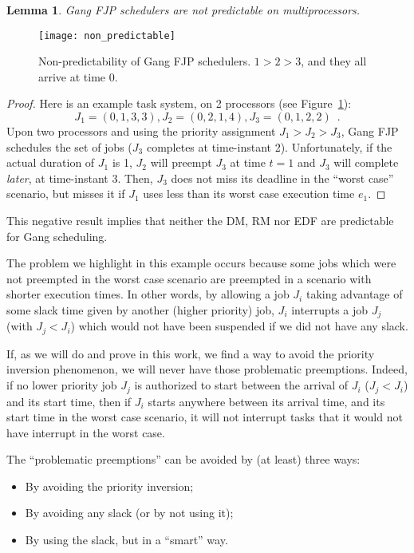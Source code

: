 \documentclass[a4paper]{article}
\newtheorem{lemma}[theorem]{Lemma}
\begin{document}
\begin{lemma}\label{lem:notPredict}
Gang FJP schedulers are not predictable on multiprocessors.
\end{lemma}

\begin{figure}
\begin{center}
\texttt{[image: non\_predictable]}
\caption{\label{fig:notPredictable}Non-predictability of Gang FJP schedulers. $1 > 2 > 3$, and they all arrive at time $0$.} 
\end{center}\end{figure}

\begin{proof}
Here is an example task system, on 2 processors (see Figure~\ref{fig:notPredictable}):
\[ J_{1} = (0, 1, 3, 3), J_{2} = (0, 2, 1, 4), J_{3} = (0, 1, 2, 2)\enspace.\]
Upon two processors and using the priority assignment $J_{1}>J_{2}>J_{3}$, Gang FJP schedules the set of jobs ($J_{3}$ completes at time-instant 2). Unfortunately, if the actual duration of $J_{1}$ is 1, $J_{2}$ will preempt $J_{3}$ at time $t=1$ and $J_{3}$ will complete \emph{later}, at time-instant 3. Then, $J_3$ does not miss its deadline in the ``worst case'' scenario, but misses it if $J_1$ uses less than its worst case execution time $e_1$.
\end{proof}

This negative result implies that neither the DM, RM nor EDF are predictable for Gang scheduling. 

The problem we highlight in this example occurs because some jobs which were not preempted in the worst case scenario are preempted in a scenario with shorter execution times. In other words, by allowing a job $J_i$ taking advantage of some slack time given by another (higher priority) job, $J_i$ interrupts a job $J_j$ (with $J_j<J_i$) which would not have been suspended if we did not have any slack.

If, as we will do and prove in this work, we find a way to avoid the priority inversion phenomenon, we will never have those problematic preemptions. Indeed, if no lower priority job $J_j$ is authorized to start between the arrival of $J_i$ ($J_j<J_i$) and its start time, then if $J_i$ starts anywhere between its arrival time, and its start time in the worst case scenario, it will not interrupt tasks that it would not have interrupt in the worst case.

The ``problematic preemptions'' can be avoided by (at least) three ways:
\begin{itemize}
\item By avoiding the priority inversion;
\item By avoiding any slack (or by not using it);
\item By using the slack, but in a ``smart'' way.
\end{itemize}
\end{document}

